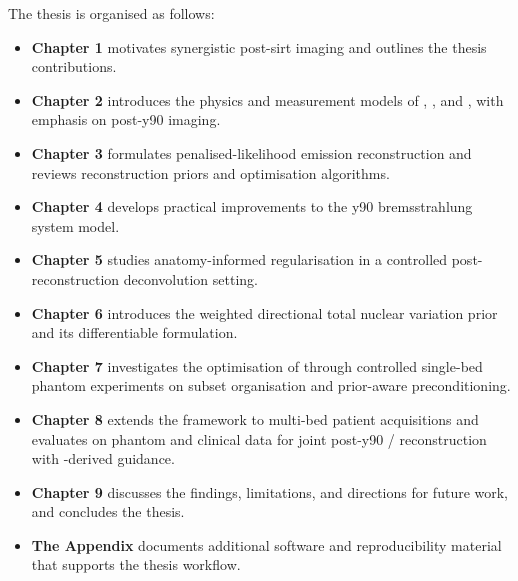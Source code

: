 The thesis is organised as follows:
\begin{itemize}
    \item \textbf{Chapter 1} motivates synergistic post-\gls{sirt} imaging and outlines the thesis contributions.
    \item \textbf{Chapter 2} introduces the physics and measurement models of , , and , with emphasis on post-\gls{y90} imaging.
    \item \textbf{Chapter 3} formulates penalised-likelihood emission reconstruction and reviews reconstruction priors and optimisation algorithms.
    \item \textbf{Chapter 4} develops practical improvements to the \gls{y90} bremsstrahlung  system model.
    \item \textbf{Chapter 5} studies anatomy-informed regularisation in a controlled post-reconstruction deconvolution setting.
    \item \textbf{Chapter 6} introduces the weighted directional total nuclear variation prior and its differentiable formulation.
    \item \textbf{Chapter 7} investigates the optimisation of  through controlled single-bed phantom experiments on subset organisation and prior-aware preconditioning.
    \item \textbf{Chapter 8} extends the framework to multi-bed patient acquisitions and evaluates  on phantom and clinical data for joint post-\gls{y90} / reconstruction with -derived guidance.
    \item \textbf{Chapter 9} discusses the findings, limitations, and directions for future work, and concludes the thesis.
    \item \textbf{The Appendix} documents additional software and reproducibility material that supports the thesis workflow.
\end{itemize}
